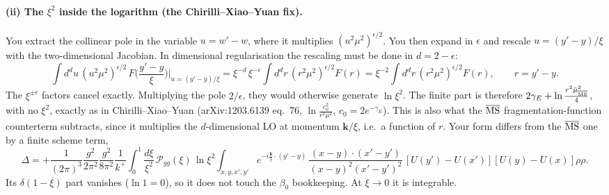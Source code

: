 \documentclass[10pt]{article}
\newcommand{\mub}{\bar\mu_{\overline{\rm MS}}}
\begin{document}
\paragraph{(ii) The $\xi^2$ inside the logarithm (the Chirilli--Xiao--Yuan fix).} You extract the collinear pole in the variable
$u=w'-w$, where it multiplies $(u^2\mu^2)^{\epsilon/2}$. You then expand in $\epsilon$ and rescale $u=(y'-y)/\xi$ with the two-dimensional Jacobian.
In dimensional regularisation the rescaling must be done in $d=2-\epsilon$:
\[
\int d^du\,(u^2\mu^2)^{\epsilon/2}\,F\Big(\frac{y'-y}{\xi}\Big)\Big|_{u=(y'-y)/\xi}=\xi^{-d}\,\xi^{-\epsilon}\int d^dr\,(r^2\mu^2)^{\epsilon/2}F(r)=\xi^{-2}\int d^dr\,(r^2\mu^2)^{\epsilon/2}F(r),\qquad r=y'-y .
\]
The $\xi^{\pm\epsilon}$ factors cancel exactly. Multiplying the pole $2/\epsilon$, they would otherwise generate $\ln\xi^2$. The finite part is therefore
$2\gamma_E+\ln\frac{r^2\mub^2}{4}$, with no $\xi^2$, exactly as in Chirilli--Xiao--Yuan (arXiv:1203.6139 eq.~76, $\ln\frac{c_0^2}{r^2\mu^2}$,
$c_0=2e^{-\gamma_E}$). This is also what the $\overline{\rm MS}$ fragmentation-function counterterm subtracts, since it multiplies the
$d$-dimensional LO at momentum $\mathbf k/\xi$, i.e.\ a function of $r$. Your form differs from the $\overline{\rm MS}$ one by a finite
scheme term,
\[
\Delta=+\frac{1}{(2\pi)^3}\frac{g^2}{2\pi^2}\frac{g^2}{8\pi^2}\frac1{k^+}\int_0^1\frac{d\xi}{\xi^2}\,\mathcal P_{gg}(\xi)\,\ln\xi^2\int_{x,y,x',y'}e^{-i\frac{\mathbf k}{\xi}\cdot(y'-y)}\,\frac{(x-y)\cdot(x'-y')}{(x-y)^2(x'-y')^2}\,[U(y')-U(x')][U(y)-U(x)]\rho\rho .
\]
Its $\delta(1-\xi)$ part vanishes ($\ln1=0$), so it does not touch the $\beta_0$ bookkeeping. At $\xi\to0$ it is integrable.
\end{document}
